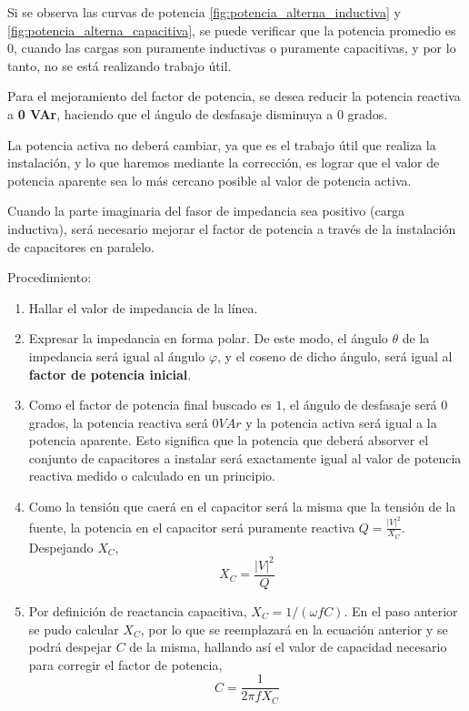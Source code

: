 Si se observa las curvas de potencia \ref{fig:potencia_alterna_inductiva} y \ref{fig:potencia_alterna_capacitiva}, se puede verificar que la potencia promedio es 0, cuando las cargas son puramente inductivas o puramente capacitivas, y por lo tanto, no se está realizando trabajo útil.

Para el mejoramiento del factor de potencia, se desea reducir la potencia reactiva a \textbf{0 VAr}, haciendo que el ángulo de desfasaje disminuya a 0 grados.

La potencia activa no deberá cambiar, ya que es el trabajo útil que realiza la instalación, y lo que haremos mediante la corrección, es lograr que el valor de potencia aparente sea lo más cercano posible al valor de potencia activa.

Cuando la parte imaginaria del fasor de impedancia sea positivo (carga inductiva), será necesario mejorar el factor de potencia a través de la instalación de capacitores en paralelo.

Procedimiento:

\begin{enumerate}
	\item Hallar el valor de impedancia de la línea.
	\item Expresar la impedancia en forma polar. De este modo, el ángulo $\theta$ de la impedancia será igual al ángulo $\varphi$, y el coseno de dicho ángulo, será igual al \textbf{factor de potencia inicial}.
	\item Como el factor de potencia final buscado es $1$, el ángulo de desfasaje será $0$ grados, la potencia reactiva será $0 VAr$ y la potencia activa será igual a la potencia aparente. Esto significa que la potencia que deberá absorver el conjunto de capacitores a instalar será exactamente igual al valor de potencia reactiva medido o calculado en un principio.
	\item Como la tensión que caerá en el capacitor será la misma que la tensión de la fuente, la potencia en el capacitor será puramente reactiva $ Q = \frac{|V|^{2}}{X_C} $. Despejando $X_C$, $$X_C = \frac{|V|^{2}}{Q}$$
	\item Por definición de reactancia capacitiva, $X_C=1/(\omega f C)$. En el paso anterior se pudo calcular $X_C$, por lo que se reemplazará en la ecuación anterior y se podrá despejar $C$ de la misma, hallando así el valor de capacidad necesario para corregir el factor de potencia, $$C=\frac{1}{2\pi f X_C}$$
\end{enumerate}